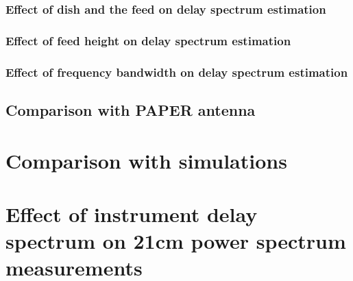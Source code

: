 \documentclass[twocolumn]{emulateapj}
\begin{document}
\subsubsection{Effect of dish and the feed on delay spectrum estimation}
\subsubsection{Effect of feed height on delay spectrum estimation}
\subsubsection{Effect of frequency bandwidth on delay spectrum estimation}
\subsection{Comparison with PAPER antenna}
\section{Comparison with simulations}
\section{Effect of instrument delay spectrum on 21cm power spectrum measurements }
\end{document}

